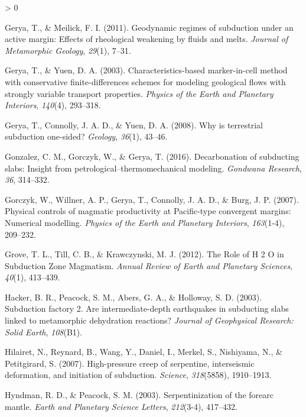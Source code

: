 \documentclass[draft,linenumbers]{agujournal2018}
\newlength{\cslhangindent}
\newenvironment{CSLReferences}[2] %
 {%
  \setlength{\parindent}{0pt}
  \ifodd #1 \everypar{\setlength{\hangindent}{\cslhangindent}}\ignorespaces\fi
  \ifnum #2 > 0
  \setlength{\parskip}{#2\baselineskip}
  \fi
 }%
 {}
\begin{document}
\begin{CSLReferences}{1}{0}
\leavevmode{}%
Gerya, T., \& Meilick, F. I. (2011). Geodynamic regimes of subduction
under an active margin: Effects of rheological weakening by fluids and
melts. \emph{Journal of Metamorphic Geology}, \emph{29}(1), 7--31.

\leavevmode{}%
Gerya, T., \& Yuen, D. A. (2003). {Characteristics-based marker-in-cell
method with conservative finite-differences schemes for modeling
geological flows with strongly variable transport properties}.
\emph{Physics of the Earth and Planetary Interiors}, \emph{140}(4),
293--318.

\leavevmode{}%
Gerya, T., Connolly, J. A. D., \& Yuen, D. A. (2008). {Why is
terrestrial subduction one-sided?} \emph{Geology}, \emph{36}(1), 43--46.

\leavevmode{}%
Gonzalez, C. M., Gorczyk, W., \& Gerya, T. (2016). Decarbonation of
subducting slabs: Insight from petrological--thermomechanical modeling.
\emph{Gondwana Research}, \emph{36}, 314--332.

\leavevmode{}%
Gorczyk, W., Willner, A. P., Gerya, T., Connolly, J. A. D., \& Burg, J.
P. (2007). {Physical controls of magmatic productivity at Pacific-type
convergent margins: Numerical modelling}. \emph{Physics of the Earth and
Planetary Interiors}, \emph{163}(1-4), 209--232.

\leavevmode{}%
Grove, T. L., Till, C. B., \& Krawczynski, M. J. (2012). {The Role of H
2 O in Subduction Zone Magmatism}. \emph{Annual Review of Earth and
Planetary Sciences}, \emph{40}(1), 413--439.

\leavevmode{}%
Hacker, B. R., Peacock, S. M., Abers, G. A., \& Holloway, S. D. (2003).
{Subduction factory 2. Are intermediate-depth earthquakes in subducting
slabs linked to metamorphic dehydration reactions?} \emph{Journal of
Geophysical Research: Solid Earth}, \emph{108}(B1).

\leavevmode{}%
Hilairet, N., Reynard, B., Wang, Y., Daniel, I., Merkel, S., Nishiyama,
N., \& Petitgirard, S. (2007). High-pressure creep of serpentine,
interseismic deformation, and initiation of subduction. \emph{Science},
\emph{318}(5858), 1910--1913.

\leavevmode{}%
Hyndman, R. D., \& Peacock, S. M. (2003). Serpentinization of the
forearc mantle. \emph{Earth and Planetary Science Letters},
\emph{212}(3-4), 417--432.


\end{CSLReferences}
\end{document}
